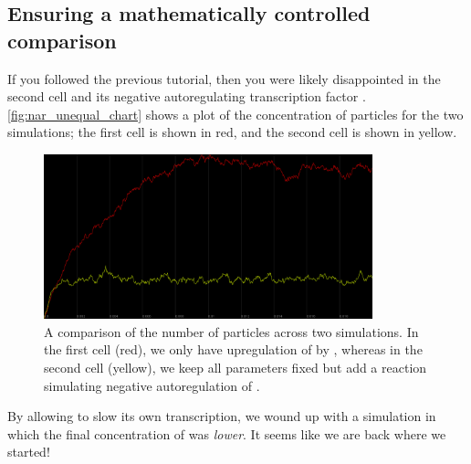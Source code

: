 \begin{note}\end{note}

\FloatBarrier
{}
\subsection{Ensuring a mathematically controlled comparison}

If you followed the previous tutorial, then you were likely disappointed in the second cell and its negative autoregulating transcription factor . \autoref{fig:nar_unequal_chart} shows a plot of the concentration of  particles for the two simulations; the first cell is shown in red, and the second cell is shown in yellow.\\

\begin{figure}[h]
\centering
\mySfFamily
\includegraphics[width = 0.85\textwidth]{../images/cellblender_nar_unequal_chart.png}
\caption{A comparison of the number of  particles across two simulations. In the first cell (red), we only have upregulation of  by , whereas in the second cell (yellow), we keep all parameters fixed but add a reaction simulating negative autoregulation of .}
\label{fig:nar_unequal_chart}
\end{figure}

By allowing  to slow its own transcription, we wound up with a simulation in which the final concentration of  was \textit{lower}. It seems like we are back where we started!


